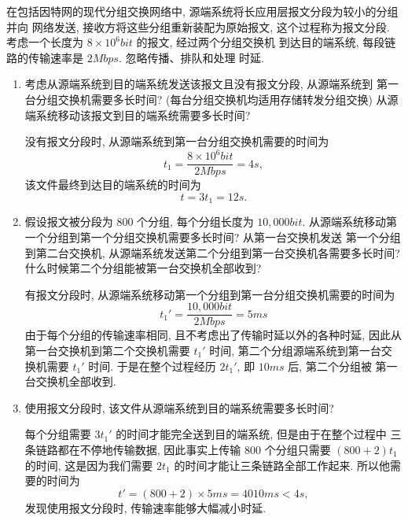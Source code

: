 \documentclass[10pt,UTF8]{ctexbook} %
\begin{document}
\begin{example}
    在包括因特网的现代分组交换网络中, 源端系统将长应用层报文分段为较小的分组并向
    网络发送, 接收方将这些分组重新装配为原始报文, 这个过程称为报文分段.
    考虑一个长度为 $8 \times 10^6 \si{bit}$ 的报文, 经过两个分组交换机
    到达目的端系统, 每段链路的传输速率是 $2 \si{Mbps}$. 忽略传播、排队和处理
    时延.
    \begin{enumerate}[label={$\left.\mathrm{\alph*}\right)$}, itemsep=0pt]
        \item 考虑从源端系统到目的端系统发送该报文且没有报文分段, 从源端系统到
        第一台分组交换机需要多长时间? (每台分组交换机均适用存储转发分组交换)
        从源端系统移动该报文到目的端系统需要多长时间?
        \begin{sol}
            没有报文分段时, 从源端系统到第一台分组交换机需要的时间为
            \[ t_1 = \frac{8 \times 10^6 \si{bit}}{2 \si{Mbps}} = 4\si{s}, \]
        该文件最终到达目的端系统的时间为
        \[ t = 3t_1 = 12 \si{s}. \]
        \end{sol}
        \item 假设报文被分段为 800 个分组, 每个分组长度为 $10,000\si{bit}$.
        从源端系统移动第一个分组到第一个分组交换机需要多长时间? 从第一台交换机发送
        第一个分组到第二台交换机, 从源端系统发送第二个分组到第一台交换机各需要多长时间?
        什么时候第二个分组能被第一台交换机全部收到?
        \begin{sol}
            有报文分段时, 从源端系统移动第一个分组到第一台分组交换机需要的时间为
            \[ t_1' = \frac{10,000 \si{bit}}{2 \si{Mbps}} = 5\si{ms} \]
            由于每个分组的传输速率相同, 且不考虑出了传输时延以外的各种时延,
            因此从第一台交换机到第二个交换机需要 $t_1'$ 时间,
            第二个分组源端系统到第一台交换机需要 $t_1'$ 时间.
            于是在整个过程经历 $2t_1'$, 即 $10\si{ms}$ 后, 第二个分组被
            第一台交换机全部收到.
        \end{sol}
        \item 使用报文分段时, 该文件从源端系统到目的端系统需要多长时间?
        \begin{sol}
            每个分组需要 $3t_1'$ 的时间才能完全送到目的端系统, 但是由于在整个过程中
            三条链路都在不停地传输数据, 因此事实上传输 800 个分组只需要 $(800+2)t_1$
            的时间, 这是因为我们需要 $2t_1$ 的时间才能让三条链路全部工作起来.
            所以他需要的时间为
            \[ t' = (800+2) \times 5\si{ms} = 4010 \si{ms} < 4\si{s}, \]
            发现使用报文分段时, 传输速率能够大幅减小时延.
        \end{sol}

\end{enumerate}
\end{example}
\end{document}

